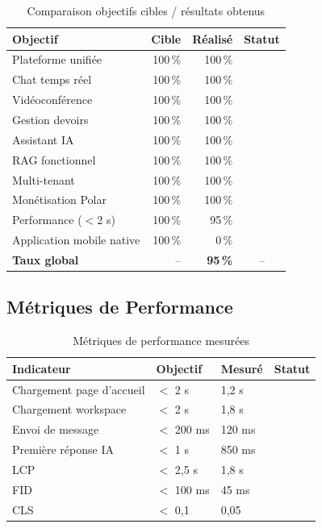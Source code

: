 \documentclass[12pt, a4paper, twoside]{report}
\newcommand{\cmark}{\ding{51}}
\newcommand{\xmark}{\ding{55}}
\begin{document}
\begin{table}[H]

  \begin{tabularx}{\textwidth}{|X|r|r|c|}
    \hline
    \textbf{Objectif} & \textbf{Cible} & \textbf{Réalisé} & \textbf{Statut} \\
    \hline
    Plateforme unifiée        & 100\,\% & 100\,\% & \cmark \\
    Chat temps réel           & 100\,\% & 100\,\% & \cmark \\
    Vidéoconférence           & 100\,\% & 100\,\% & \cmark \\
    Gestion devoirs           & 100\,\% & 100\,\% & \cmark \\
    Assistant IA              & 100\,\% & 100\,\% & \cmark \\
    RAG fonctionnel           & 100\,\% & 100\,\% & \cmark \\
    Multi-tenant              & 100\,\% & 100\,\% & \cmark \\
    Monétisation Polar        & 100\,\% & 100\,\% & \cmark \\
    Performance ($<$2 s)      & 100\,\% &  95\,\% & \cmark \\
    Application mobile native & 100\,\% &   0\,\% & \xmark \\
    \hline
    \textbf{Taux global} & -- & \textbf{95\,\%} & -- \\
    \hline
  \end{tabularx}
    \caption{Comparaison objectifs cibles / résultats obtenus}
  \label{tab:objectives}
\end{table}

\subsection{Métriques de Performance}

\begin{table}[H]

  \begin{tabularx}{\textwidth}{|X|l|l|c|}
    \hline
    \textbf{Indicateur} & \textbf{Objectif} & \textbf{Mesuré} & \textbf{Statut} \\
    \hline
    Chargement page d'accueil  & $<$ 2 s    & 1,2 s  & \cmark \\
    Chargement workspace       & $<$ 2 s    & 1,8 s  & \cmark \\
    Envoi de message           & $<$ 200 ms & 120 ms & \cmark \\
    Première réponse IA        & $<$ 1 s    & 850 ms & \cmark \\
    LCP                        & $<$ 2,5 s  & 1,8 s  & \cmark \\
    FID                        & $<$ 100 ms & 45 ms  & \cmark \\
    CLS                        & $<$ 0,1    & 0,05   & \cmark \\
    \hline
  \end{tabularx}
    \caption{Métriques de performance mesurées}
  \label{tab:perf-results}
\end{table}
\end{document}
